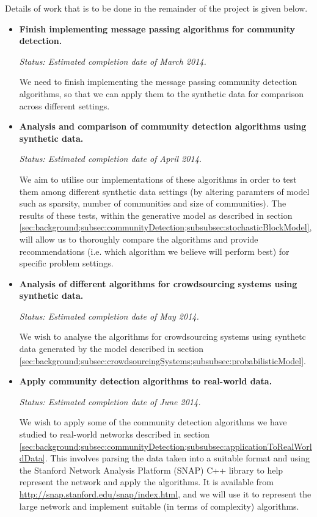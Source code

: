 \documentclass[12pt]{article}
\numberwithin{equation}{section}
\begin{document}
Details of work that is to be done in the remainder of the project is given below.
\begin{itemize}
	\item \textbf{Finish implementing message passing algorithms for community detection.}

	\textit{Status: Estimated completion date of March 2014.}	

	We need to finish implementing the message passing community detection algorithms, so that we can apply them to the synthetic data for comparison across different settings.

	\item \textbf{Analysis and comparison of community detection algorithms using synthetic data.}

	\textit{Status: Estimated completion date of April 2014.}	

	We aim to utilise our implementations of these algorithms in order to test them among different synthetic data settings (by altering paramters of model such as sparsity, number of communities and size of communities). The results of these tests, within the generative model as described in section \ref{sec:background;subsec:communityDetection;subsubsec:stochasticBlockModel}, will allow us to thoroughly compare the algorithms and provide recommendations (i.e. which algorithm we believe will perform best) for specific problem settings.

	\item \textbf{Analysis of different algorithms for crowdsourcing systems using synthetic data.}

	\textit{Status: Estimated completion date of May 2014.}	

	We wish to analyse the algorithms for crowdsourcing systems using synthetc data generated by the model described in section \ref{sec:background;subsec:crowdsourcingSystems;subsubsec:probabilisticModel}.

	\item \textbf{Apply community detection algorithms to real-world data.}

	\textit{Status: Estimated completion date of June 2014.}	

	We wish to apply some of the community detection algorithms we have studied to real-world networks described in section \ref{sec:background;subsec:communityDetection;subsubsec:applicationToRealWorldData}. This involves parsing the data taken into a suitable format and using the Stanford Network Analysis Platform (SNAP) C++ library to help represent the network and apply the algorithms. It is available from \url{http://snap.stanford.edu/snap/index.html}, and we will use it to represent the large network and implement suitable (in terms of complexity) algorithms.
\end{itemize}
\end{document}
